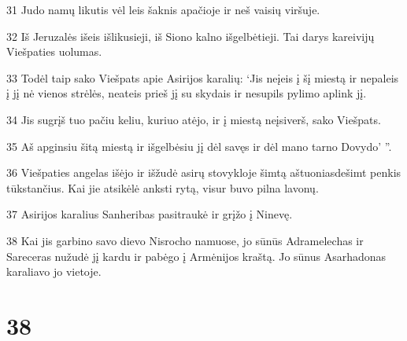 \par 31 Judo namų likutis vėl leis šaknis apačioje ir neš vaisių viršuje. 
\par 32 Iš Jeruzalės išeis išlikusieji, iš Siono kalno išgelbėtieji. Tai darys kareivijų Viešpaties uolumas. 
\par 33 Todėl taip sako Viešpats apie Asirijos karalių: ‘Jis neįeis į šį miestą ir nepaleis į jį nė vienos strėlės, neateis prieš jį su skydais ir nesupils pylimo aplink jį. 
\par 34 Jis sugrįš tuo pačiu keliu, kuriuo atėjo, ir į miestą neįsiverš,­ sako Viešpats.­ 
\par 35 Aš apginsiu šitą miestą ir išgelbėsiu jį dėl savęs ir dėl mano tarno Dovydo’ ”. 
\par 36 Viešpaties angelas išėjo ir išžudė asirų stovykloje šimtą aštuoniasdešimt penkis tūkstančius. Kai jie atsikėlė anksti rytą, visur buvo pilna lavonų. 
\par 37 Asirijos karalius Sanheribas pasitraukė ir grįžo į Ninevę. 
\par 38 Kai jis garbino savo dievo Nisrocho namuose, jo sūnūs Adramelechas ir Sareceras nužudė jį kardu ir pabėgo į Armėnijos kraštą. Jo sūnus Asarhadonas karaliavo jo vietoje.



\chapter{38}


